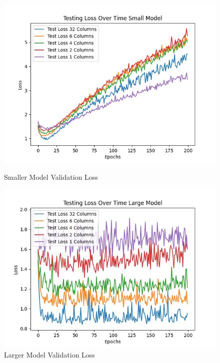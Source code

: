 \documentclass{article}
\begin{document}
\begin{figure}
		\includegraphics[width = \linewidth]{figures/test_loss_over_time_small.png}
		\caption{Smaller Model Validation Loss}
	\endminipage\hfill
		\includegraphics[width = \linewidth]{figures/test_loss_over_time_large_model.png}
		\caption{Larger Model Validation Loss}
	\endminipage\hfill	
\end{figure}
\end{document}
